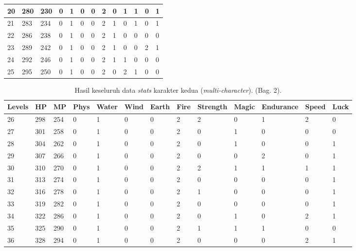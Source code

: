 \begin{sidewaystable}[!h]
\begin{tabular}{|l|l|l|l|l|l|l|l|l|l|l|l|l|}
		20 & 280 & 230 & 0 & 1 & 0 & 0 & 2 & 0 & 1 & 1 & 0 & 1 \\ \hline
		21 & 283 & 234 & 0 & 1 & 0 & 0 & 2 & 1 & 0 & 1 & 0 & 1 \\ \hline
		22 & 286 & 238 & 0 & 1 & 0 & 0 & 2 & 1 & 0 & 0 & 0 & 0 \\ \hline
		23 & 289 & 242 & 0 & 1 & 0 & 0 & 2 & 1 & 0 & 0 & 2 & 1 \\ \hline
		24 & 292 & 246 & 0 & 1 & 0 & 0 & 2 & 1 & 1 & 0 & 0 & 0 \\ \hline
		25 & 295 & 250 & 0 & 1 & 0 & 0 & 2 & 0 & 2 & 1 & 0 & 0 \\ \hline	
	\end{tabular}
\end{sidewaystable}
\clearpage


\begin{sidewaystable}[!h]
	\centering
	\caption{Hasil keseluruh data \textit{stats} karakter kedua (\textit{multi-character}). (Bag. 2).}
	\label{tb:player_all_stats_2_2}
	\vspace{1ex}
	\begin{tabular}{|l|l|l|l|l|l|l|l|l|l|l|l|l|}
		\hline
		\rowcolor[HTML]{C0C0C0} 
		\textbf{Levels} & \textbf{HP} & \textbf{MP} & \textbf{Phys} & \textbf{Water} & \textbf{Wind} & \textbf{Earth} & \textbf{Fire} & \textbf{Strength} & \textbf{Magic} & \textbf{Endurance} & \textbf{Speed} & \textbf{Luck} \\ \hline
		26 & 298 & 254 & 0 & 1 & 0 & 0 & 2 & 2 & 0 & 1 & 2 & 0 \\ \hline
		27 & 301 & 258 & 0 & 1 & 0 & 0 & 2 & 0 & 1 & 0 & 0 & 0 \\ \hline
		28 & 304 & 262 & 0 & 1 & 0 & 0 & 2 & 0 & 1 & 0 & 0 & 1 \\ \hline
		29 & 307 & 266 & 0 & 1 & 0 & 0 & 2 & 0 & 0 & 2 & 0 & 1 \\ \hline
		30 & 310 & 270 & 0 & 1 & 0 & 0 & 2 & 2 & 1 & 1 & 1 & 1 \\ \hline
		31 & 313 & 274 & 0 & 1 & 0 & 0 & 2 & 0 & 0 & 0 & 0 & 1 \\ \hline
		32 & 316 & 278 & 0 & 1 & 0 & 0 & 2 & 1 & 0 & 0 & 0 & 1 \\ \hline
		33 & 319 & 282 & 0 & 1 & 0 & 0 & 2 & 0 & 0 & 0 & 0 & 1 \\ \hline
		34 & 322 & 286 & 0 & 1 & 0 & 0 & 2 & 0 & 1 & 0 & 2 & 1 \\ \hline
		35 & 325 & 290 & 0 & 1 & 0 & 0 & 2 & 1 & 1 & 1 & 0 & 0 \\ \hline
		36 & 328 & 294 & 0 & 1 & 0 & 0 & 2 & 0 & 0 & 0 & 2 & 1 \\ \hline

\end{tabular}
\end{sidewaystable}
